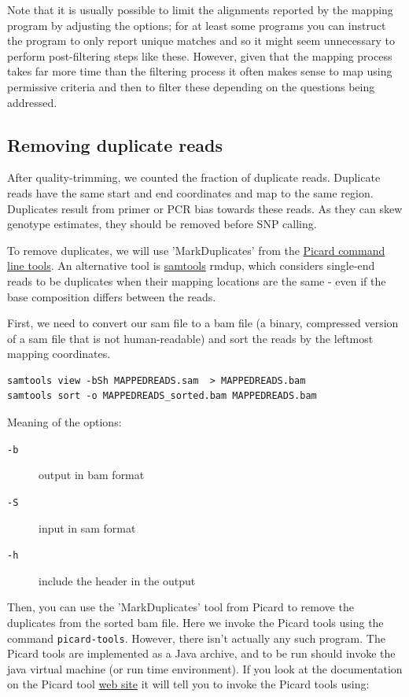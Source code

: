 \documentclass[11pt]{article}
\begin{document}
Note that it is usually possible to limit the alignments reported by the
mapping program by adjusting the options; for at least some programs you can
instruct the program to only report unique matches and so it might seem
unnecessary to perform post-filtering steps like these. However, given that
the mapping process takes far more time than the filtering process it often
makes sense to map using permissive criteria and then to filter these
depending on the questions being addressed.

\subsection{Removing duplicate reads}
\label{sec:orgheadline5}
After quality-trimming, we counted the fraction of duplicate
reads. Duplicate reads have the same start and end
coordinates and map to the same region. Duplicates result from primer
or PCR bias towards these reads. As they can skew genotype estimates,
they should be removed before SNP calling.

To remove duplicates, we will use 'MarkDuplicates' from the \href{https://broadinstitute.github.io/picard/command-line-overview.html}{Picard
command line tools}. An alternative tool is \href{http://samtools.sourceforge.net/samtools.shtml}{samtools} rmdup, which
considers single-end reads to be duplicates when their mapping
locations are the same - even if the base composition differs between
the reads.

First, we need to convert our sam file to a bam file (a binary,
compressed version of a sam file that is not human-readable) and sort
the reads by the leftmost mapping coordinates.

\begin{verbatim}
samtools view -bSh MAPPEDREADS.sam  > MAPPEDREADS.bam
samtools sort -o MAPPEDREADS_sorted.bam MAPPEDREADS.bam
\end{verbatim}

Meaning of the options:
\begin{description}
\item[{\texttt{-b}}] output in bam format
\item[{\texttt{-S}}] input in sam format
\item[{\texttt{-h}}] include the header in the output
\end{description}

Then, you can use the 'MarkDuplicates' tool from Picard
to remove the duplicates from the sorted bam file. Here we invoke
the Picard tools using the command \texttt{picard-tools}. However, 
there isn't actually any such program. The Picard tools are implemented
as a Java archive, and to be run should invoke the java virtual machine 
(or run time environment). If you look at the documentation on the 
Picard tool \href{http://broadinstitute.github.io/picard/}{web site} it will tell you to invoke the Picard tools using:
\end{document}
